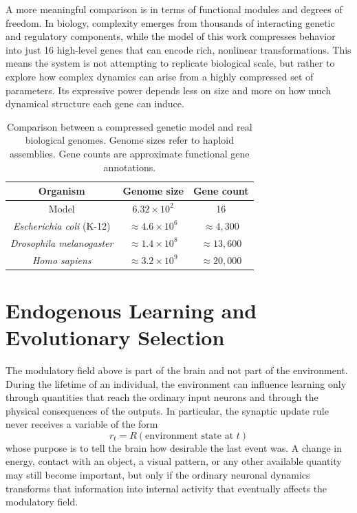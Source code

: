 \documentclass[12pt,a4paper]{article}
\begin{document}
A more meaningful comparison is in terms of functional modules and degrees of freedom. In biology, complexity emerges from thousands of interacting genetic and regulatory components, while the model of this work compresses behavior into just 16 high-level genes that can encode rich, nonlinear transformations. This means the system is not attempting to replicate biological scale, but rather to explore how complex dynamics can arise from a highly compressed set of parameters. Its expressive power depends less on size and more on how much dynamical structure each gene can induce.

	\begin{table}[h]
	\centering
	\begin{tabular}{|c|c|c|}
		\hline
		\textbf{Organism} & \textbf{Genome size} & \textbf{Gene count} \\
		\hline
		Model & $6.32 \times 10^{2}$ & 16 \\
		\textit{Escherichia coli} (K-12) & $\approx 4.6 \times 10^{6}$ & $\approx 4{,}300$  \\
		\textit{Drosophila melanogaster} & $\approx 1.4 \times 10^{8}$ & $\approx 13{,}600$  \\
		\textit{Homo sapiens} & $\approx 3.2 \times 10^{9}$ & $\approx 20{,}000$  \\
		\hline
	\end{tabular}
	\caption{\footnotesize{Comparison between a compressed genetic model and real biological genomes. Genome sizes refer to haploid assemblies. Gene counts are approximate functional gene annotations.}}
	\end{table}
	

\section{Endogenous Learning and Evolutionary Selection}

	The modulatory field above is part of the brain and not part of the environment. During the lifetime of an individual, the environment can influence learning only through quantities that reach the ordinary input neurons and through the physical consequences of the outputs. In particular, the synaptic update rule never receives a variable of the form
	$$r_t=R(\text{environment state at }t)$$
	whose purpose is to tell the brain how desirable the last event was. A change in energy, contact with an object, a visual pattern, or any other available quantity may still become important, but only if the ordinary neuronal dynamics transforms that information into internal activity that eventually affects the modulatory field.
\end{document}
